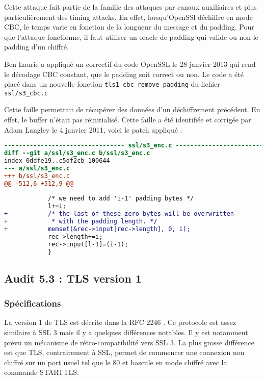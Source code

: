 
Cette attaque \cite{vaudenay2002} fait partie de la famille des attaques par canaux auxiliaires et plus particulièrement des timing attacks. En effet, lorsqu'OpenSSl déchiffre en mode CBC, le temps varie en fonction de la longueur du message et du padding. Pour que l'attaque fonctionne, il faut utiliser un oracle de padding qui valide ou non le padding d'un chiffré.

Ben Laurie a appliqué un correctif du code OpenSSL le 28 janvier 2013 qui rend le décodage CBC constant, que le padding soit correct ou non. Le code a été placé dans un nouvelle fonction \verb+tls1_cbc_remove_padding+ du fichier \verb+ssl/s3_cbc.c+


Cette faille permettait de récupérer des données d'un déchiffrement précédent. En effet, le buffer n'était pas réinitialisé. Cette faille a été identifiée \cite{CVE20114576} et corrigée par Adam Langley le 4 janvier 2011, voici le patch appliqué :

\begin{lstlisting}[language=diff,caption=patch-cve-2011-4576, label=patch-cve-2011-4576]
--------------------------------- ssl/s3_enc.c --------------------------------
diff --git a/ssl/s3_enc.c b/ssl/s3_enc.c
index 0ddfe19..c5df2cb 100644
--- a/ssl/s3_enc.c
+++ b/ssl/s3_enc.c
@@ -512,6 +512,9 @@
 
            /* we need to add 'i-1' padding bytes */
            l+=i;
+           /* the last of these zero bytes will be overwritten
+            * with the padding length. */
+           memset(&rec->input[rec->length], 0, i);
            rec->length+=i;
            rec->input[l-1]=(i-1);
            }
\end{lstlisting}


\subsection{Audit 5.3 : TLS version 1}
\subsubsection{Spécifications}

La version 1 de TLS est décrite dans la RFC 2246 \cite{rfc2246}. Ce protocole est assez similaire à SSL 3 mais il y a quelques différences notables. Il y est notamment prévu un mécanisme de rétro-compatibilité vers SSL 3. La plus grosse différence est que TLS, contrairement à SSL, permet de commencer une connexion non chiffré sur un port usuel tel que le 80 et bascule en mode chiffré avec la commande STARTTLS.

